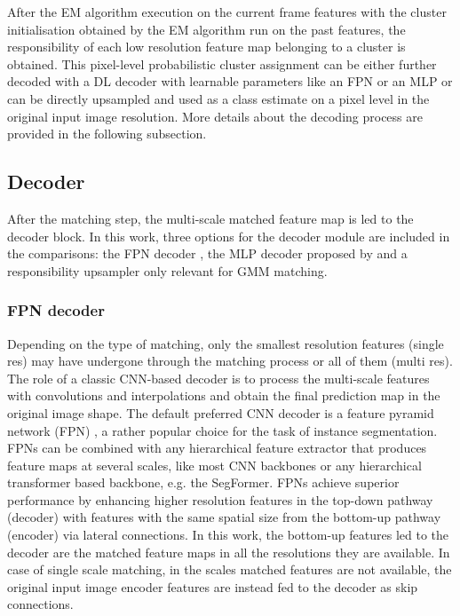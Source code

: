 After the EM algorithm execution on the current frame features with the cluster initialisation obtained by the EM algorithm run on the past features, the responsibility of each low resolution feature map belonging to a cluster is obtained. This pixel-level probabilistic cluster assignment can be either further decoded with a DL decoder with learnable parameters like an FPN or an MLP or can be directly upsampled and used as a class estimate on a pixel level in the original input image resolution. More details about the decoding process are provided in the following subsection.

\vspace{5mm}

\subsection{Decoder}

After the matching step, the multi-scale matched feature map is led to the decoder block. 
In this work, three options for the decoder module are included in the comparisons: the FPN decoder \parencite{fpn}, the MLP decoder proposed by \cite{segformer} and a responsibility upsampler only relevant for GMM matching. 

\subsubsection{FPN decoder}
Depending on the type of matching, only the smallest resolution features (single res)
may have undergone through the matching process or all of them (multi res). The role of a classic CNN-based decoder is to process the multi-scale features with convolutions and interpolations and obtain the final prediction map in the original image shape.
The default preferred CNN decoder is a feature pyramid network (FPN) \parencite{fpn}, a rather popular choice for the task of instance segmentation. FPNs can be combined with any hierarchical feature extractor that produces feature maps at several scales, like most CNN backbones or any hierarchical transformer based backbone, e.g. the SegFormer. FPNs achieve superior performance by enhancing higher resolution features in the top-down pathway (decoder) with features with the same spatial size from the bottom-up pathway (encoder) via lateral connections. In this work, the bottom-up features led to the decoder are the matched feature maps in all the resolutions they are available. In case of single scale matching, in the scales matched features are not available, the original input image encoder features are instead fed to the decoder as skip connections. 
\par
